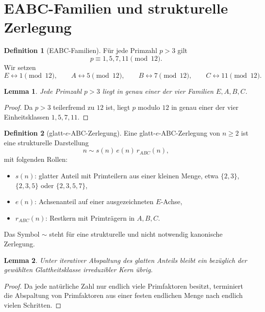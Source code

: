 \documentclass[11pt,a4paper]{article}
\newtheorem{lemma}{Lemma}
\theoremstyle{definition}
\newtheorem{definition}{Definition}
\begin{document}
\section{EABC-Familien und strukturelle Zerlegung}

\begin{definition}[EABC-Familien]
Für jede Primzahl $p>3$ gilt
\[
p\equiv 1,5,7,11 \pmod{12}.
\]
Wir setzen
\[
E\leftrightarrow 1 \pmod{12},\qquad
A\leftrightarrow 5 \pmod{12},\qquad
B\leftrightarrow 7 \pmod{12},\qquad
C\leftrightarrow 11 \pmod{12}.
\]
\end{definition}

\begin{lemma}
Jede Primzahl $p>3$ liegt in genau einer der vier Familien $E,A,B,C$.
\end{lemma}

\begin{proof}
Da $p>3$ teilerfremd zu $12$ ist, liegt $p$ modulo $12$ in genau einer der vier Einheitsklassen $1,5,7,11$. \qedhere
\end{proof}

\begin{definition}[glatt-$e$-ABC-Zerlegung]
Eine glatt-$e$-ABC-Zerlegung von $n\ge 2$ ist eine strukturelle Darstellung
\[
 n\sim s(n)\,e(n)\,r_{ABC}(n),
\]
mit folgenden Rollen:
\begin{itemize}[leftmargin=1.5em]
\item $s(n)$: glatter Anteil mit Primteilern aus einer kleinen Menge, etwa $\{2,3\}$, $\{2,3,5\}$ oder $\{2,3,5,7\}$,
\item $e(n)$: Achsenanteil auf einer ausgezeichneten $E$-Achse,
\item $r_{ABC}(n)$: Restkern mit Primträgern in $A,B,C$.
\end{itemize}
Das Symbol $\sim$ steht für eine strukturelle und nicht notwendig kanonische Zerlegung.
\end{definition}

\begin{lemma}
Unter iterativer Abspaltung des glatten Anteils bleibt ein bezüglich der gewählten Glattheitsklasse irreduzibler Kern übrig.
\end{lemma}

\begin{proof}
Da jede natürliche Zahl nur endlich viele Primfaktoren besitzt, terminiert die Abspaltung von Primfaktoren aus einer festen endlichen Menge nach endlich vielen Schritten. \qedhere
\end{proof}
\end{document}
